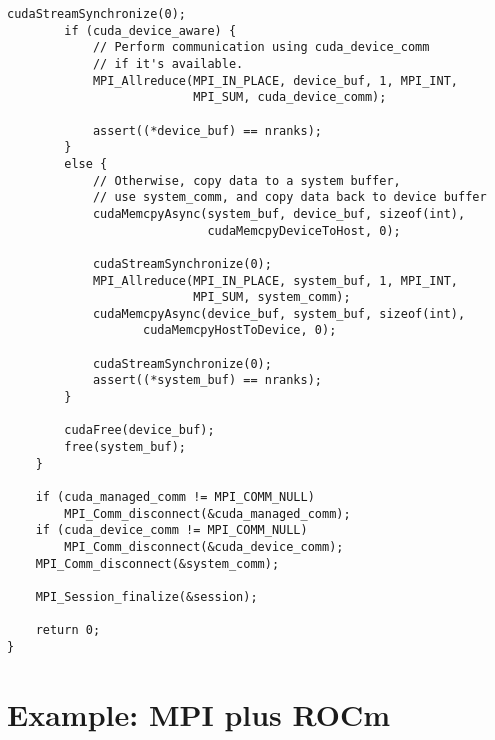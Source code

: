 \begin{example}
\begin{lstlisting}[language={[MPI]C}]
        cudaStreamSynchronize(0);
        if (cuda_device_aware) {
            // Perform communication using cuda_device_comm
            // if it's available.
            MPI_Allreduce(MPI_IN_PLACE, device_buf, 1, MPI_INT,
                          MPI_SUM, cuda_device_comm);

            assert((*device_buf) == nranks);
        }
        else {
            // Otherwise, copy data to a system buffer,
            // use system_comm, and copy data back to device buffer
            cudaMemcpyAsync(system_buf, device_buf, sizeof(int),
                            cudaMemcpyDeviceToHost, 0);

            cudaStreamSynchronize(0);
            MPI_Allreduce(MPI_IN_PLACE, system_buf, 1, MPI_INT,
                          MPI_SUM, system_comm);
            cudaMemcpyAsync(device_buf, system_buf, sizeof(int),
                   cudaMemcpyHostToDevice, 0);

            cudaStreamSynchronize(0);
            assert((*system_buf) == nranks);
        }

        cudaFree(device_buf);
        free(system_buf);
    }

    if (cuda_managed_comm != MPI_COMM_NULL)
        MPI_Comm_disconnect(&cuda_managed_comm);
    if (cuda_device_comm != MPI_COMM_NULL)
        MPI_Comm_disconnect(&cuda_device_comm);
    MPI_Comm_disconnect(&system_comm);

    MPI_Session_finalize(&session);

    return 0;
}
\end{lstlisting}
\end{example}

\section{Example: MPI plus ROCm}

